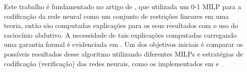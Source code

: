 Este trabalho é fundamentado no artigo de , que utilizada um 0-1 MILP \cite{milp_01} para a codificação da rede neural como um conjunto de restrições lineares em uma teoria, então são computadas explicações para os seus resultados com o uso do raciocínio abdutivo. A necessidade de tais explicações computadas carregando uma garantia formal é evidenciada em . Um dos objetivos iniciais é comparar os possíveis resultados desse algoritmo utilizando diferentes MILPs e estratégias de codificação (verificação) das redes neurais, como os implementados em  e .